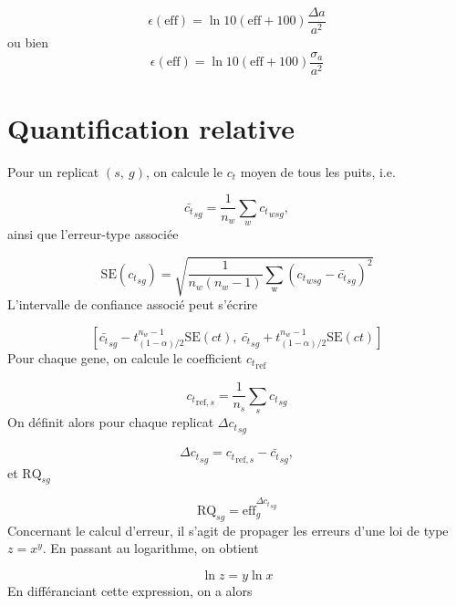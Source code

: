 \documentclass[a4paper,10pt]{article}
\begin{document}
\begin{equation}
 \epsilon(\text{eff}) = \ln 10(\text{eff}+100) \dfrac{\Delta a}{a^2}
\end{equation}
{\color{red} ou bien} 
\begin{equation}
 \epsilon(\text{eff}) = \ln 10(\text{eff}+100) \dfrac{\sigma_a}{a^2}
\end{equation}


\section{Quantification relative}

Pour un replicat $(s,\ g)$, on calcule le $c_t$ moyen de tous les puits, i.e.

\begin{equation}
 {\bar{c_t}}_{sg} = \dfrac{1}{n_w}\sum_{w}{c_t}_{wsg},
\end{equation}
ainsi que l'erreur-type associée

\begin{equation}
 \text{SE} ({c_t}_{sg}) =
\sqrt{\dfrac{1}{n_w(n_w-1)}\sum_{\text{w}}
({c_t}_{wsg}-{\bar{c_t}}_{sg})^2}
\end{equation}
L'intervalle de confiance associé peut s'écrire

\begin{equation}
 \left[{\bar{c_t}}_{sg}-t_{(1-\alpha)/2}^{n_w-1}\text{SE}(ct),\
{\bar{c_t}}_{sg}+t_{(1-\alpha)/2}^{n_w-1}\text{SE}(ct)\right]
\end{equation}
Pour chaque gene, on calcule le coefficient ${c_t}_{\text{ref}}$

\begin{equation}
 {c_t}_{\text{ref},s} = \dfrac{1}{n_s}\sum_{s}{c_t}_{sg} 
\end{equation}
On définit alors pour chaque replicat ${\Delta c_t}_{sg}$

\begin{equation}
 {\Delta c_t}_{sg} = {c_t}_{\text{ref},s} - {\bar{c_t}}_{sg},
\end{equation}
et $\text{RQ}_{sg}$

\begin{equation}
 \text{RQ}_{sg} = \text{eff}_g^{{\Delta c_t}_{sg}}
\end{equation}
Concernant le calcul d'erreur, il s'agit de propager les erreurs d'une loi de
type $z=x^y$. En passant au logarithme, on obtient

\begin{equation}
 \ln z = y\ln x
\end{equation}
En différanciant cette expression, on a alors
\end{document}
